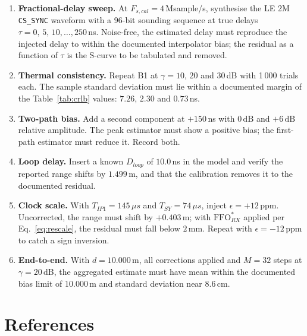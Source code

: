 \documentclass[11pt,a4paper]{article}
\newcommand{\us}{\,\ensuremath{\upmu}s}
\newcommand{\FFO}{\mathrm{FFO}}
\newcommand{\Tsy}{T_{SY}}
\newcommand{\Tip}{T_{IP1}}
\newcommand{\code}[1]{\texttt{\small #1}}
\providecommand{\upmu}{\mu}
\begin{document}
\begin{enumerate}[label=\textbf{B\arabic*.},leftmargin=2.6em,itemsep=2pt]
  \item \textbf{Fractional-delay sweep.} At $F_{s,cal} = 4$\,Msample/s, synthesise the LE 2M
    \code{CS\_SYNC} waveform with a 96-bit sounding sequence at true delays
    $\tau = 0,\,5,\,10,\ldots,250$\,ns. Noise-free, the estimated delay must reproduce the injected
    delay to within the documented interpolator bias; the residual as a function of $\tau$ is the
    S-curve to be tabulated and removed.
  \item \textbf{Thermal consistency.} Repeat B1 at $\gamma = 10$, $20$ and $30$\,dB with 1\,000
    trials each. The sample standard deviation must lie within a documented margin of the
    Table~\ref{tab:crlb} values: $7.26$, $2.30$ and $0.73$\,ns.
  \item \textbf{Two-path bias.} Add a second component at $+150$\,ns with $0\,\mathrm{dB}$ and
    $+6\,\mathrm{dB}$ relative amplitude. The peak estimator must show a positive bias; the
    first-path estimator must reduce it. Record both.
  \item \textbf{Loop delay.} Insert a known $D_{loop}$ of $10.0$\,ns in the model and verify the
    reported range shifts by $1.499$\,m, and that the calibration removes it to the documented
    residual.
  \item \textbf{Clock scale.} With $\Tip = 145\us$ and $\Tsy = 74\us$, inject $\epsilon = +12$\,ppm.
    Uncorrected, the range must shift by $+0.403$\,m; with $\FFO^{*}_{RX}$ applied per
    Eq.~\eqref{eq:rescale}, the residual must fall below $2$\,mm. Repeat with $\epsilon = -12$\,ppm to
    catch a sign inversion.
  \item \textbf{End-to-end.} With $d = 10.000$\,m, all corrections applied and $M = 32$ steps at
    $\gamma = 20$\,dB, the aggregated estimate must have mean within the documented bias limit of
    $10.000$\,m and standard deviation near $8.6$\,cm.
\end{enumerate}

\clearpage
\section*{References}
\end{document}
